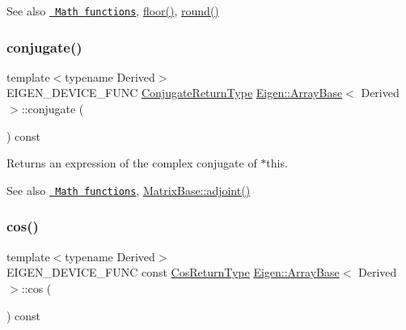 \begin{DoxySeeAlso}{See also}
\href{group__CoeffwiseMathFunctions.html\#cwisetable_ceil}{\texttt{ Math functions}}, \mbox{\hyperlink{class_eigen_1_1_array_base_a1dbd24e0b04ddd157436086266f917fd}{floor()}}, \mbox{\hyperlink{class_eigen_1_1_array_base_a354b5032ab3852a015a55b4dbf257d3d}{round()}} 
\end{DoxySeeAlso}
\mbox{\label{class_eigen_1_1_array_base_a06602058e7d80827b7b0ec7cb72a747a}} 
\subsubsection{\texorpdfstring{conjugate()}{conjugate()}}
{\footnotesize\ttfamily template$<$typename Derived$>$ \\
E\+I\+G\+E\+N\+\_\+\+D\+E\+V\+I\+C\+E\+\_\+\+F\+U\+NC \mbox{\hyperlink{struct_eigen_1_1internal_1_1true__type}{Conjugate\+Return\+Type}} \mbox{\hyperlink{class_eigen_1_1_array_base}{Eigen\+::\+Array\+Base}}$<$ Derived $>$\+::conjugate (\begin{DoxyParamCaption}{ }\end{DoxyParamCaption}) const\hspace{0.3cm}{\ttfamily [inline]}}

\begin{DoxyReturn}{Returns}
an expression of the complex conjugate of {\ttfamily $\ast$this}.
\end{DoxyReturn}
\begin{DoxySeeAlso}{See also}
\href{group__CoeffwiseMathFunctions.html\#cwisetable_conj}{\texttt{ Math functions}}, \mbox{\hyperlink{class_eigen_1_1_matrix_base_afacca1f88da57e5cd87dd07c8ff926bb}{Matrix\+Base\+::adjoint()}} 
\end{DoxySeeAlso}
\mbox{\label{class_eigen_1_1_array_base_abe1bff4421b16e62e75f932b83c4d31f}} 
\subsubsection{\texorpdfstring{cos()}{cos()}}
{\footnotesize\ttfamily template$<$typename Derived$>$ \\
E\+I\+G\+E\+N\+\_\+\+D\+E\+V\+I\+C\+E\+\_\+\+F\+U\+NC const \mbox{\hyperlink{class_eigen_1_1_cwise_unary_op}{Cos\+Return\+Type}} \mbox{\hyperlink{class_eigen_1_1_array_base}{Eigen\+::\+Array\+Base}}$<$ Derived $>$\+::cos (\begin{DoxyParamCaption}{ }\end{DoxyParamCaption}) const\hspace{0.3cm}{\ttfamily [inline]}}

